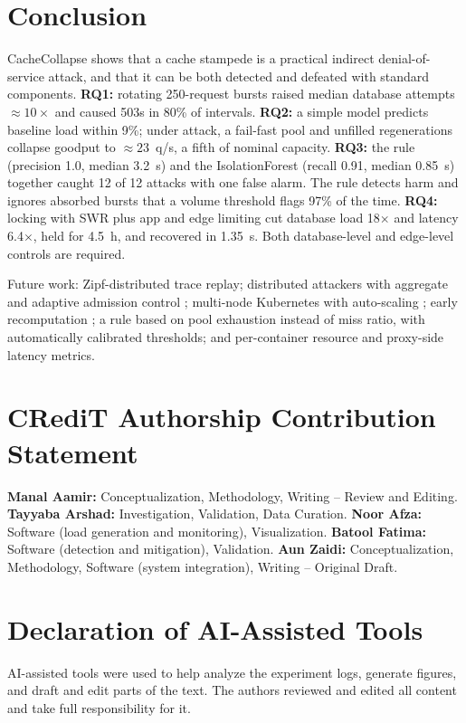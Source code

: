 \documentclass[journal]{IEEEtran}
\begin{document}
\section{Conclusion}
\label{sec:conclusion}
CacheCollapse shows that a cache stampede is a practical indirect denial-of-service
attack, and that it can be both detected and defeated with standard components.
\textbf{RQ1:} rotating 250-request bursts raised median database attempts ${\approx}10\times$
and caused 503s in 80\% of intervals. \textbf{RQ2:} a simple model predicts baseline load
within 9\%; under attack, a fail-fast pool and unfilled regenerations collapse goodput to
${\approx}23$~q/s, a fifth of nominal capacity. \textbf{RQ3:} the rule (precision 1.0,
median 3.2~s) and the IsolationForest (recall 0.91, median 0.85~s) together caught 12 of
12 attacks with one false alarm. The rule detects harm and ignores absorbed bursts that a
volume threshold flags 97\% of the time. \textbf{RQ4:} locking with SWR plus app and edge
limiting cut database load 18$\times$ and latency 6.4$\times$, held for 4.5~h, and
recovered in 1.35~s. Both database-level and edge-level controls are required.

Future work: Zipf-distributed trace replay; distributed attackers with aggregate and
adaptive admission control \cite{ranjan2009}; multi-node Kubernetes with
auto-scaling \cite{sides2016,bremlerbarr2017}; early recomputation \cite{vattani2015}; a
rule based on pool exhaustion instead of miss ratio, with automatically calibrated
thresholds; and per-container resource and proxy-side latency metrics.

\section*{CRediT Authorship Contribution Statement}
\textbf{Manal Aamir:} Conceptualization, Methodology, Writing -- Review and Editing.
\textbf{Tayyaba Arshad:} Investigation, Validation, Data Curation.
\textbf{Noor Afza:} Software (load generation and monitoring), Visualization.
\textbf{Batool Fatima:} Software (detection and mitigation), Validation.
\textbf{Aun Zaidi:} Conceptualization, Methodology, Software (system integration),
Writing -- Original Draft.

\section*{Declaration of AI-Assisted Tools}
AI-assisted tools were used to help analyze the experiment logs, generate figures, and
draft and edit parts of the text. The authors reviewed and edited all content and take
full responsibility for it.



\end{document}
